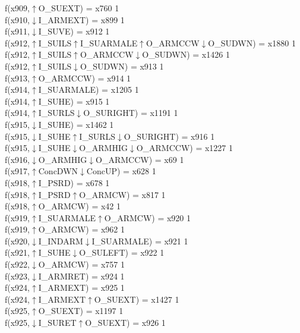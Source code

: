 f(x909,$\uparrow$O\_SUEXT) = x760 {1} \\
f(x910,$\downarrow$I\_ARMEXT) = x899 {1} \\
f(x911,$\downarrow$I\_SUVE) = x912 {1} \\
f(x912,$\uparrow$I\_SUILS$\uparrow$I\_SUARMALE$\uparrow$O\_ARMCCW$\downarrow$O\_SUDWN) = x1880 {1} \\
f(x912,$\uparrow$I\_SUILS$\uparrow$O\_ARMCCW$\downarrow$O\_SUDWN) = x1426 {1} \\
f(x912,$\uparrow$I\_SUILS$\downarrow$O\_SUDWN) = x913 {1} \\
f(x913,$\uparrow$O\_ARMCCW) = x914 {1} \\
f(x914,$\uparrow$I\_SUARMALE) = x1205 {1} \\
f(x914,$\uparrow$I\_SUHE) = x915 {1} \\
f(x914,$\uparrow$I\_SURLS$\downarrow$O\_SURIGHT) = x1191 {1} \\
f(x915,$\downarrow$I\_SUHE) = x1462 {1} \\
f(x915,$\downarrow$I\_SUHE$\uparrow$I\_SURLS$\downarrow$O\_SURIGHT) = x916 {1} \\
f(x915,$\downarrow$I\_SUHE$\downarrow$O\_ARMHIG$\downarrow$O\_ARMCCW) = x1227 {1} \\
f(x916,$\downarrow$O\_ARMHIG$\downarrow$O\_ARMCCW) = x69 {1} \\
f(x917,$\uparrow$ConcDWN$\downarrow$ConcUP) = x628 {1} \\
f(x918,$\uparrow$I\_PSRD) = x678 {1} \\
f(x918,$\uparrow$I\_PSRD$\uparrow$O\_ARMCW) = x817 {1} \\
f(x918,$\uparrow$O\_ARMCW) = x42 {1} \\
f(x919,$\uparrow$I\_SUARMALE$\uparrow$O\_ARMCW) = x920 {1} \\
f(x919,$\uparrow$O\_ARMCW) = x962 {1} \\
f(x920,$\downarrow$I\_INDARM$\downarrow$I\_SUARMALE) = x921 {1} \\
f(x921,$\uparrow$I\_SUHE$\downarrow$O\_SULEFT) = x922 {1} \\
f(x922,$\downarrow$O\_ARMCW) = x757 {1} \\
f(x923,$\downarrow$I\_ARMRET) = x924 {1} \\
f(x924,$\uparrow$I\_ARMEXT) = x925 {1} \\
f(x924,$\uparrow$I\_ARMEXT$\uparrow$O\_SUEXT) = x1427 {1} \\
f(x925,$\uparrow$O\_SUEXT) = x1197 {1} \\
f(x925,$\downarrow$I\_SURET$\uparrow$O\_SUEXT) = x926 {1} \\
